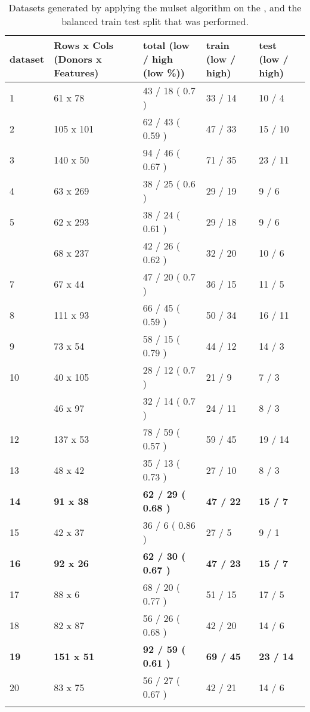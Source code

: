 \begin{table}[htpb]
    \begin{tabularx}{\textwidth}{XXXXX}
\toprule{}
        dataset & Rows x Cols (Donors x Features) & total (low / high (low \%)) & train (low / high) & test (low / high)\\
\midrule{}
1 & 61 x 78 & 43 / 18 ( 0.7 ) & 33 / 14 & 10 / 4\\
2 & 105 x 101 & 62 / 43 ( 0.59 ) & 47 / 33 & 15 / 10\\
3 & 140 x 50 & 94 / 46 ( 0.67 ) & 71 / 35 & 23 / 11\\
4 & 63 x 269 & 38 / 25 ( 0.6 ) & 29 / 19 & 9 / 6\\
5 & 62 x 293 & 38 / 24 ( 0.61 ) & 29 / 18 & 9 / 6\\
\addlinespace
6 & 68 x 237 & 42 / 26 ( 0.62 ) & 32 / 20 & 10 / 6\\
7 & 67 x 44 & 47 / 20 ( 0.7 ) & 36 / 15 & 11 / 5\\
8 & 111 x 93 & 66 / 45 ( 0.59 ) & 50 / 34 & 16 / 11\\
9 & 73 x 54 & 58 / 15 ( 0.79 ) & 44 / 12 & 14 / 3\\
10 & 40 x 105 & 28 / 12 ( 0.7 ) & 21 / 9 & 7 / 3\\
\addlinespace
11 & 46 x 97 & 32 / 14 ( 0.7 ) & 24 / 11 & 8 / 3\\
12 & 137 x 53 & 78 / 59 ( 0.57 ) & 59 / 45 & 19 / 14\\
13 & 48 x 42 & 35 / 13 ( 0.73 ) & 27 / 10 & 8 / 3\\
\textbf{14} & \textbf{91 x 38} & \textbf{62 / 29 ( 0.68 )} & \textbf{47 / 22} & \textbf{15 / 7}\\
15 & 42 x 37 & 36 / 6 ( 0.86 ) & 27 / 5 & 9 / 1\\
\addlinespace
\textbf{16} & \textbf{92 x 26} & \textbf{62 / 30 ( 0.67 )} & \textbf{47 / 23} & \textbf{15 / 7}\\
17 & 88 x 6 & 68 / 20 ( 0.77 ) & 51 / 15 & 17 / 5\\
18 & 82 x 87 & 56 / 26 ( 0.68 ) & 42 / 20 & 14 / 6\\
\textbf{19} & \textbf{151 x 51} & \textbf{92 / 59 ( 0.61 )} & \textbf{69 / 45} & \textbf{23 / 14}\\
20 & 83 x 75 & 56 / 27 ( 0.67 ) & 42 / 21 & 14 / 6\\
\bottomrule{}
\end{tabularx}
    \caption{Datasets generated by applying the mulset algorithm on the \simon
    \firstvis, and the balanced train test split that was performed.}\label{tbl:mulsetDatasets}
\end{table}


